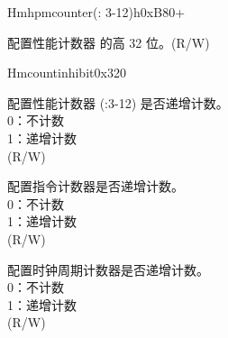 \begin{register}{H}{mhpmcounter(: 3-12)h}{0xB80+}\label{regdesc:LPMHPMCOUNTERH}
%
\regnewline%
\begin{regdesc}\begin{reglist}
\label{fielddesc:LPMHMPCOUNTERH}\item [MHPMCOUNTER\regindex{n}h] 配置性能计数器  的高 32 位。(R/W)
\end{reglist}\end{regdesc}
\end{register}


\begin{register}{H}{mcountinhibit}{0x320}\label{regdesc:LPMCOUNTINHIBIT}
%
%
%
%
\regnewline%
\begin{regdesc}\begin{reglist}
\label{fielddesc:LPMCOUNTINHIBITHPM}\item [HPM] 配置性能计数器 (:3-12) 是否递增计数。\\
0：不计数\\
1：递增计数\\
(R/W)
\label{fielddesc:LPMCOUNTINHIBITIR}\item [IR] 配置指令计数器是否递增计数。\\
0：不计数\\
1：递增计数\\
(R/W)
\label{fielddesc:LPMCOUNTINHIBITCY}\item [CY] 配置时钟周期计数器是否递增计数。\\
0：不计数\\
1：递增计数\\
(R/W)
\end{reglist}\end{regdesc}
\end{register}


